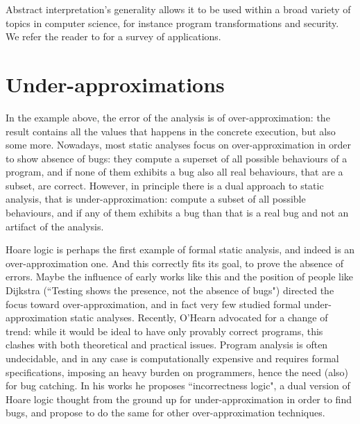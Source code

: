 Abstract interpretation's generality allows it to be used within a broad variety of topics in computer science, for instance program transformations and security. We refer the reader to \cite{cousot-absint-survey} for a survey of applications.

\section{Under-approximations}
In the example above, the error of the analysis is of over-approximation: the result contains all the values that happens in the concrete execution, but also some more.
Nowadays, most static analyses focus on over-approximation in order to show absence of bugs: they compute a superset of all possible behaviours of a program, and if none of them exhibits a bug also all real behaviours, that are a subset, are correct. However, in principle there is a dual approach to static analysis, that is under-approximation: compute a subset of all possible behaviours, and if any of them exhibits a bug than that is a real bug and not an artifact of the analysis.

Hoare logic \cite{hoare-logic} is perhaps the first example of formal static analysis, and indeed is an over-approximation one. And this correctly fits its goal, to prove the absence of errors. Maybe the influence of early works like this and the position of people like Dijkstra (``Testing shows the presence, not the absence of bugs") directed the focus toward over-approximation, and in fact very few studied formal under-approximation static analyses.
Recently, O'Hearn \cite{ohearn-incorrectness-logic} advocated for a change of trend: while it would be ideal to have only provably correct programs, this clashes with both theoretical and practical issues. Program analysis is often undecidable, and in any case is computationally expensive and requires formal specifications, imposing an heavy burden on programmers, hence the need (also) for bug catching. In his works he proposes ``incorrectness logic", a dual version of Hoare logic thought from the ground up for under-approximation in order to find bugs, and propose to do the same for other over-approximation techniques.

